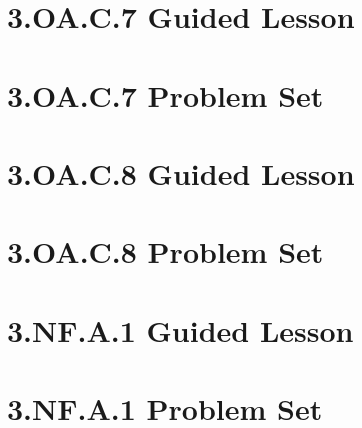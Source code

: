 \documentclass[a4paper,12pt]{article}
\begin{document}
\newpage
\section{3.OA.C.7 Guided Lesson}


\newpage
\section{3.OA.C.7 Problem Set}


\newpage
\section{3.OA.C.8 Guided Lesson}


\newpage
\section{3.OA.C.8 Problem Set}


\newpage
\section{3.NF.A.1 Guided Lesson}


\newpage
\section{3.NF.A.1 Problem Set}

\end{document}
